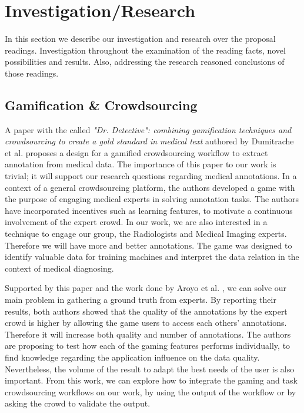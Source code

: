 \section{Investigation/Research}

In this section we describe our investigation and research over the proposal readings. Investigation throughout the examination of the reading facts, novel possibilities and results. Also, addressing the research reasoned conclusions of those readings.

\subsection{Gamification \& Crowdsourcing}

A paper with the called \textit{"Dr. Detective": combining gamification techniques and crowdsourcing to create a gold standard in medical text} authored by Dumitrache et al. \cite{dumitrache2013dr} proposes a design for a gamified crowdsourcing workflow to extract annotation from medical data. The importance of this paper to our work is trivial; it will support our research questions regarding medical annotations. In a context of a general crowdsourcing platform, the authors developed a game with the purpose of engaging medical experts in solving annotation tasks. The authors have incorporated incentives such as learning features, to motivate a continuous involvement of the expert crowd. In our work, we are also interested in a technique to engage our group, the Radiologists and Medical Imaging experts. Therefore we will have more and better annotations. The game was designed to identify valuable data for training machines and interpret the data relation in the context of medical diagnosing.

Supported by this paper and the work done by Aroyo et al. \cite{aroyo2013crowd}, we can solve our main problem in gathering a ground truth from experts. By reporting their results, both authors showed that the quality of the annotations by the expert crowd is higher by allowing the game users to access each others' annotations. Therefore it will increase both quality and number of annotations. The authors are proposing to test how each of the gaming features performs individually, to find knowledge regarding the application influence on the data quality. Nevertheless, the volume of the result to adapt the best needs of the user is also important. From this work, we can explore how to integrate the gaming and task crowdsourcing workflows on our work, by using the output of the workflow or by asking the crowd to validate the output.


